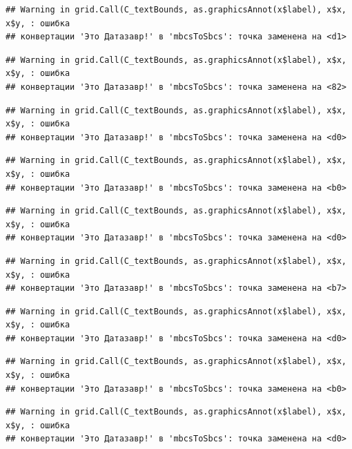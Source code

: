 \documentclass[]{book}
\begin{document}
\begin{verbatim}
## Warning in grid.Call(C_textBounds, as.graphicsAnnot(x$label), x$x, x$y, : ошибка
## конвертации 'Это Датазавр!' в 'mbcsToSbcs': точка заменена на <d1>
\end{verbatim}

\begin{verbatim}
## Warning in grid.Call(C_textBounds, as.graphicsAnnot(x$label), x$x, x$y, : ошибка
## конвертации 'Это Датазавр!' в 'mbcsToSbcs': точка заменена на <82>
\end{verbatim}

\begin{verbatim}
## Warning in grid.Call(C_textBounds, as.graphicsAnnot(x$label), x$x, x$y, : ошибка
## конвертации 'Это Датазавр!' в 'mbcsToSbcs': точка заменена на <d0>
\end{verbatim}

\begin{verbatim}
## Warning in grid.Call(C_textBounds, as.graphicsAnnot(x$label), x$x, x$y, : ошибка
## конвертации 'Это Датазавр!' в 'mbcsToSbcs': точка заменена на <b0>
\end{verbatim}

\begin{verbatim}
## Warning in grid.Call(C_textBounds, as.graphicsAnnot(x$label), x$x, x$y, : ошибка
## конвертации 'Это Датазавр!' в 'mbcsToSbcs': точка заменена на <d0>
\end{verbatim}

\begin{verbatim}
## Warning in grid.Call(C_textBounds, as.graphicsAnnot(x$label), x$x, x$y, : ошибка
## конвертации 'Это Датазавр!' в 'mbcsToSbcs': точка заменена на <b7>
\end{verbatim}

\begin{verbatim}
## Warning in grid.Call(C_textBounds, as.graphicsAnnot(x$label), x$x, x$y, : ошибка
## конвертации 'Это Датазавр!' в 'mbcsToSbcs': точка заменена на <d0>
\end{verbatim}

\begin{verbatim}
## Warning in grid.Call(C_textBounds, as.graphicsAnnot(x$label), x$x, x$y, : ошибка
## конвертации 'Это Датазавр!' в 'mbcsToSbcs': точка заменена на <b0>
\end{verbatim}

\begin{verbatim}
## Warning in grid.Call(C_textBounds, as.graphicsAnnot(x$label), x$x, x$y, : ошибка
## конвертации 'Это Датазавр!' в 'mbcsToSbcs': точка заменена на <d0>
\end{verbatim}
\end{document}
